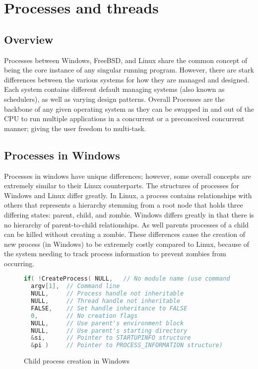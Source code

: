\section{Processes and threads}
\subsection{Overview}
Processes between Windows, FreeBSD, and Linux share the common concept of being the core instance of any singular running program. However, there are stark differences between the various systems for how they are managed and designed. Each system contains different default managing systems (also known as schedulers), as well as varying design patterns. Overall Processes are the backbone of any given operating system as they can be swapped in and out of the CPU to run multiple applications in a concurrent or a preconceived concurrent manner; giving the user freedom to multi-task.
\subsection{Processes in Windows}
Processes in windows have unique differences; however, some  overall concepts are extremely similar to their Linux counterparts. The structures of processes for Windows and Linux differ greatly. In Linux, a process contains relationships with others that represents a hierarchy stemming from a root node that holds three differing states: parent, child, and zombie\cite{wwwtldpo42:online}. Windows differs greatly in that there is no hierarchy of parent-to-child relationships. As well parents processes of a child can be killed without creating a zombie\cite{CS3013Op9:online}. These differences cause the creation of new process (in Windows) to be extremely costly compared to Linux, because of the system needing to track process information to prevent zombies from occurring.
\begin{figure}[h]
\begin{lstlisting}[language=C, style=customc]
if( !CreateProcess( NULL,   // No module name (use command line)
  argv[1],  // Command line
  NULL,     // Process handle not inheritable
  NULL,     // Thread handle not inheritable
  FALSE,    // Set handle inheritance to FALSE
  0,        // No creation flags
  NULL,     // Use parent's environment block
  NULL,     // Use parent's starting directory 
  &si,      // Pointer to STARTUPINFO structure
  &pi )     // Pointer to PROCESS_INFORMATION structure)
\end{lstlisting}
\caption{Child process creation in Windows\cite{Creating88:online}}
\end{figure}


